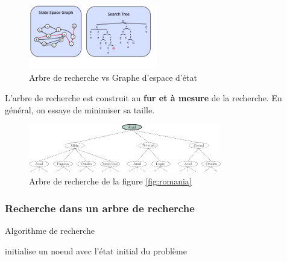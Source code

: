 \begin{figure}[H]
    \begin{center}
        \includegraphics[width=0.5\textwidth]{../pictures/st_vs_sg.png}
    \end{center}
    \caption{Arbre de recherche vs Graphe d'espace d'état}\label{fig:stvssg}
\end{figure}


\begin{note}
    L'arbre de recherche est construit au \textbf{fur et à mesure} de la recherche. 
    En général, on essaye de  minimiser sa taille.
\end{note}



\begin{figure}[H]
    \begin{center}
        \includegraphics[width=0.75\textwidth]{./pictures/romst.png}
    \end{center}
    \caption{Arbre de recherche de la figure \ref{fig:romania}}\label{fig:romst}
\end{figure}

\subsubsection{Recherche dans un arbre de recherche} %
\label{sec:recherche_dans_un_arbre_de_recherche}

\begin{algorithm}[H]
    \caption{Algorithme de recherche}\label{alg:stsearch}
    \begin{algorithmic}
        \State initialise un noeud avec l'état initial du problème

        \EndLoop
        \EndFunction
    \end{algorithmic}
\end{algorithm}

